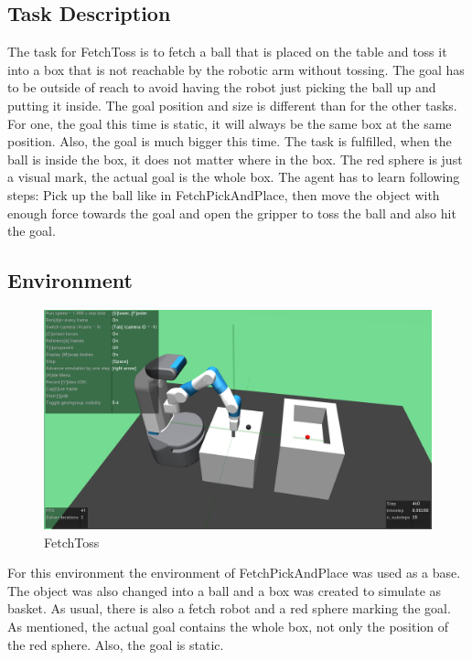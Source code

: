 \subsection{Task Description}

The task for FetchToss is to fetch a ball that is placed on the table and toss it into a box that is not reachable by the robotic arm without tossing. The goal has to be outside of reach to avoid having the robot just picking the ball up and putting it inside. The goal position and size is different than for the other tasks. For one, the goal this time is static, it will always be the same box at the same position. Also, the goal is much bigger this time. The task is fulfilled, when the ball is inside the box, it does not matter where in the box. The red sphere is just a visual mark, the actual goal is the whole box. The agent has to learn following steps: Pick up the ball like in FetchPickAndPlace, then move the object with enough force towards the goal and open the gripper to toss the ball and also hit the goal.


\subsection{Environment}

\begin{figure} [h]
	
	\centering
	\includegraphics[width=1\textwidth]{figures/FetchToss-v1.png}
	\caption{FetchToss}
	
\end{figure}

For this environment the environment of FetchPickAndPlace was used as a base. The object was also changed into a ball and a box was created to simulate as basket. As usual, there is also a fetch robot and a red sphere marking the goal. As mentioned, the actual goal contains the whole box, not only the position of the red sphere. Also, the goal is static.

